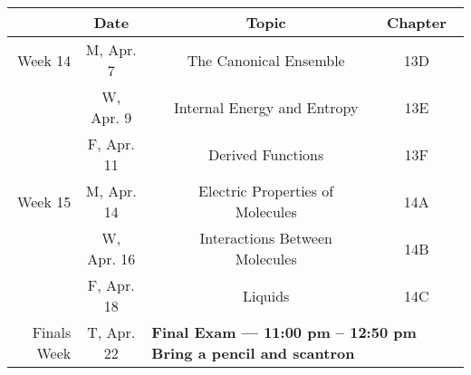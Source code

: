 \documentclass[12pt, letterpaper]{article}
\begin{document}
\begin{tabular}{rcccc}
& Date && Topic & Chapter\\
\midrule
Week 14 & M, Apr. 7&& The Canonical Ensemble & 13D\\
& W, Apr. 9&& Internal Energy and Entropy & 13E\\
& F, Apr. 11&& Derived Functions & 13F\\
\midrule
Week 15 & M, Apr. 14&& Electric Properties of Molecules & 14A\\
& W, Apr. 16&& Interactions Between Molecules & 14B\\
& F, Apr. 18&& Liquids & 14C\\
\midrule
Finals Week& T, Apr. 22& \multicolumn{3}{l}{\textbf{Final Exam --- 11:00 pm -- 12:50 pm Bring a pencil and scantron}}\\
\end{tabular}
\end{document}
